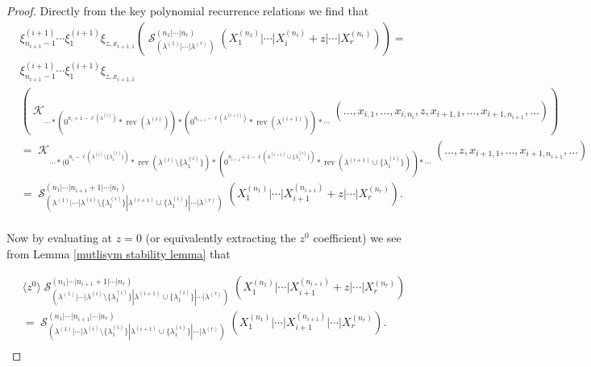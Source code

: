 \documentclass[10pt,a4paper]{amsart}
\DeclareMathOperator{\cK}{\mathcal{K}}
\DeclareMathOperator{\cS}{\mathcal{S}}
\DeclareMathOperator{\rev}{rev}
\begin{document}
\begin{proof}
    Directly from the key polynomial recurrence relations we find that
    \begin{align*}
        &\xi^{(i+1)}_{n_{i+1}-1}\cdots \xi^{(i+1)}_{1} \xi_{z,x_{i+1,1}}\left( \cS_{(\lambda^{(1)}|\cdots |\lambda^{(r)})}^{(n_1|\cdots|n_r)} (X_1^{(n_1)}|\cdots| X_{i}^{(n_i)}+z|\cdots |X_r^{(n_r)}) \right)= \\
        & \xi^{(i+1)}_{n_{i+1}-1}\cdots \xi^{(i+1)}_{1} \xi_{z,x_{i+1,1}} \\
        & \left( \cK_{\cdots * (0^{n_{i}+1-\ell(\lambda^{(i)})}*\rev(\lambda^{(i)}))*(0^{n_{i+1}-\ell(\lambda^{(i+1)})}*\rev(\lambda^{(i+1)}))*\cdots}(\ldots,x_{i,1},\ldots,x_{i,n_{i}},z,x_{i+1,1},\ldots, x_{i+1,n_{i+1}},\ldots) \right) \\
        &= \cK_{\cdots * (0^{n_{i}-\ell(\lambda^{(i)}\setminus \{\lambda^{(i)}_{1}\})}*\rev(\lambda^{(i)}\setminus \{\lambda^{(i)}_{1}\})*(0^{n_{i+1}+1-\ell(\lambda^{(i+1)} \cup \{\lambda^{(i)}_{1}\})}*\rev(\lambda^{(i+1)} \cup \{\lambda^{(i)}_{1}\}))*\cdots}(\ldots,z,x_{i+1,1},\ldots, x_{i+1,n_{i+1}},\ldots) \\
        &= \cS_{(\lambda^{(1)}|\cdots|\lambda^{(i)}\setminus \{\lambda^{(i)}_{1}\}|\lambda^{(i+1)} \cup \{\lambda^{(i)}_{1}\}|\cdots |\lambda^{(r)})}^{(n_1|\cdots|n_{i+1}+1|\cdots |n_r)} (X_1^{(n_1)}|\cdots|X_{i+1}^{(n_{i+1})}+z|\cdots |X_r^{(n_r)}).\\
    \end{align*}

Now by evaluating at $z = 0$ (or equivalently extracting the $z^0$ coefficient) we see from Lemma \ref{mutlisym stability lemma} that 


\begin{align*}
    &\langle z^0 \rangle \cS_{(\lambda^{(1)}|\cdots|\lambda^{(i)}\setminus \{\lambda^{(i)}_{1}\}|\lambda^{(i+1)} \cup \{\lambda^{(i)}_{1}\}|\cdots |\lambda^{(r)})}^{(n_1|\cdots|n_{i+1}+1|\cdots |n_r)} (X_1^{(n_1)}|\cdots|X_{i+1}^{(n_{i+1})}+z|\cdots |X_r^{(n_r)}) \\
    &= \cS_{(\lambda^{(1)}|\cdots|\lambda^{(i)}\setminus \{\lambda^{(i)}_{1}\}|\lambda^{(i+1)} \cup \{\lambda^{(i)}_{1}\}|\cdots |\lambda^{(r)})}^{(n_1|\cdots|n_{i+1}|\cdots |n_r)} (X_1^{(n_1)}|\cdots|X_{i+1}^{(n_{i+1})}|\cdots |X_r^{(n_r)}).\\
\end{align*}



    
\end{proof}
\end{document}
